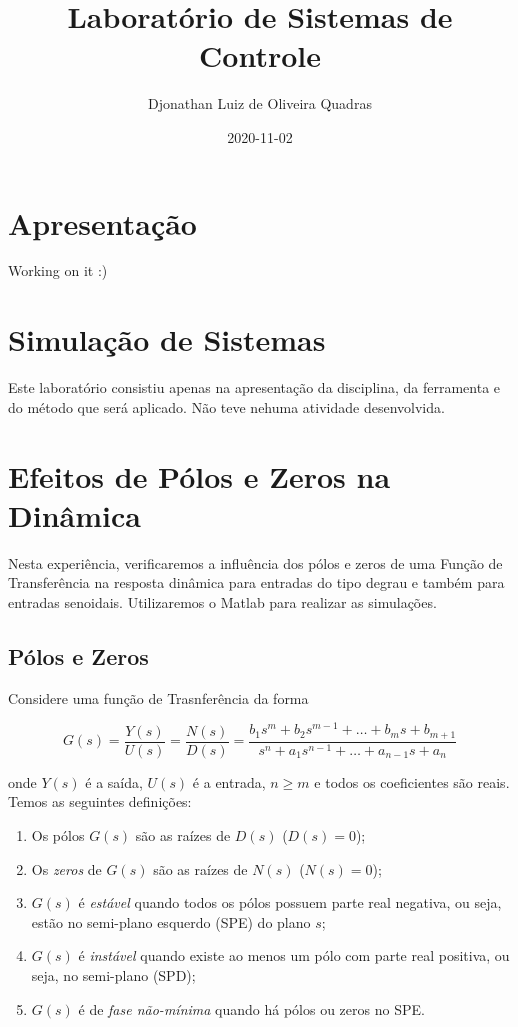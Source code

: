 \documentclass[
]{book}
\title{Laboratório de Sistemas de Controle}
\author{Djonathan Luiz de Oliveira Quadras}
\date{2020-11-02}
\providecommand{\tightlist}{%
  \setlength{\itemsep}{0pt}\setlength{\parskip}{0pt}}
\theoremstyle{definition}
\theoremstyle{definition}
\theoremstyle{definition}
\theoremstyle{remark}
\begin{document}
\maketitle

{
\setcounter{tocdepth}{1}
\tableofcontents
}
\hypertarget{apresentauxe7uxe3o}{%
\chapter*{Apresentação}\label{apresentauxe7uxe3o}}

Working on it :)

\hypertarget{simulauxe7uxe3o-de-sistemas}{%
\chapter{Simulação de Sistemas}\label{simulauxe7uxe3o-de-sistemas}}

Este laboratório consistiu apenas na apresentação da disciplina, da ferramenta e do método que será aplicado. Não teve nehuma atividade desenvolvida.

\hypertarget{lab2}{%
\chapter{Efeitos de Pólos e Zeros na Dinâmica}\label{lab2}}

Nesta experiência, verificaremos a influência dos pólos e zeros de uma Função de Transferência na resposta dinâmica para entradas do tipo degrau e também para entradas senoidais. Utilizaremos o Matlab para realizar as
simulações.

\hypertarget{puxf3los-e-zeros}{%
\section{Pólos e Zeros}\label{puxf3los-e-zeros}}

Considere uma função de Trasnferência da forma

\[
G(s) = \frac{Y(s)}{U(s)} = \frac{N(s)}{D(s)} = \frac{b_1s^m +b_2s^{m-1} + \dots + b_ms + b_{m+1}}{s^n + a_1s^{n-1}+ \dots + a_{n-1}s + a_n}
\]

onde \(Y(s)\) é a saída, \(U(s)\) é a entrada, \(n \geq m\) e todos os coeficientes são reais. Temos as seguintes definições:

\begin{enumerate}
\def\labelenumi{\arabic{enumi}.}
\tightlist
\item
  Os pólos \(G(s)\) são as raízes de \(D(s)\) (\(D(s) = 0\));
\item
  Os \emph{zeros} de \(G(s)\) são as raízes de \(N(s)\) (\(N(s) = 0\));
\item
  \(G(s)\) é \emph{estável} quando todos os pólos possuem parte real negativa, ou seja, estão no semi-plano esquerdo (SPE) do plano \(s\);
\item
  \(G(s)\) é \emph{instável} quando existe ao menos um pólo com parte real positiva, ou seja, no semi-plano (SPD);
\item
  \(G(s)\) é de \emph{fase não-mínima} quando há pólos ou zeros no SPE.
\end{enumerate}
\end{document}

